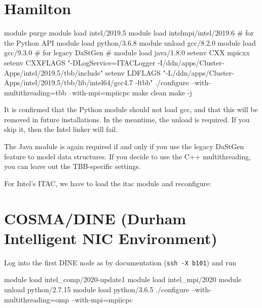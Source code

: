 \section{Hamilton}


\begin{code}
 module purge
 module load intel/2019.5
 module load intelmpi/intel/2019.6
 # for the Python API
 module load python/3.6.8 
 module unload gcc/8.2.0
 module load gcc/9.3.0
 # for legacy DaStGen
 # module load java/1.8.0
 setenv CXX mpicxx
 setenv CXXFLAGS "-DLogService=ITACLogger -I/ddn/apps/Cluster-Apps/intel/2019.5/tbb/include"
 setenv LDFLAGS "-L/ddn/apps/Cluster-Apps/intel/2019.5/tbb/lib/intel64/gcc4.7 -ltbb"
 ./configure --with-multithreading=tbb --with-mpi=mpiicpc
 make clean
 make -j
\end{code}





\begin{remark}
 It is confirmed that the Python module should not load gcc, and that this will
 be removed in future installations.
 In the meantime, the unload is required.
 If you skip it, then the Intel linker will fail.
\end{remark}

\noindent
The Java module is again required if and only if you use the legacy DaStGen
feature to model data structures.
If you decide to use the C++ multithreading, you can leave out the TBB-specific
settings.


For Intel's ITAC, we have to load the itac module and reconfigure:



\section{COSMA/DINE (Durham Intelligent NIC Environment)}


Log into the first DINE node as by documentation (\texttt{ssh -X b101}) and run

\begin{code}
module load intel_comp/2020-update1
module load intel_mpi/2020
module unload python/2.7.15
module load python/3.6.5
./configure --with-multithreading=omp --with-mpi=mpiicpc
\end{code}



